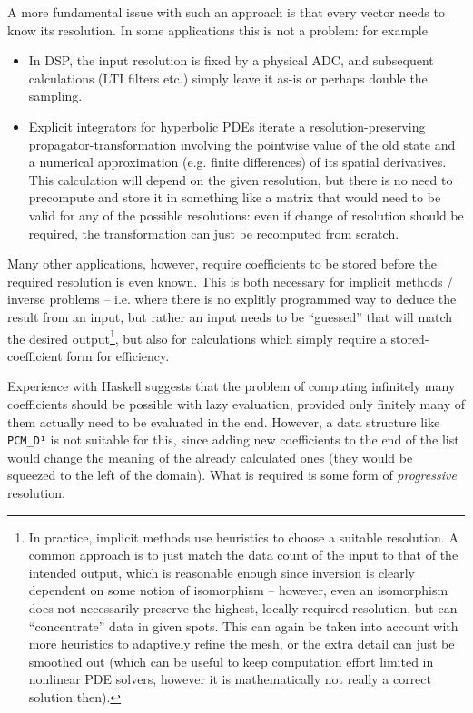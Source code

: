 \documentclass[final,sigplan,review,anonymous]{acmart}\settopmatter{printfolios=true,printccs=false,printacmref=false}
\theoremstyle{acmplain}
\theoremstyle{acmdefinition}
\begin{document}
A more fundamental issue with such an approach is that every vector needs to know its resolution.
In some applications this is not a problem: for example
\begin{itemize}
 \item In DSP, the input resolution is fixed by a physical ADC, and subsequent calculations (LTI filters etc.) simply leave it as-is or perhaps double the sampling.
 \item Explicit integrators for hyperbolic PDEs iterate a re\-so\-lu\-tion-pre\-ser\-ving pro\-pa\-ga\-tor-trans\-for\-ma\-tion in\-vol\-ving the pointwise value of the old state and a numerical approximation (e.g. finite differences) of its spatial derivatives. This calculation will depend on the given resolution, but there is no need to precompute and store it in something like a matrix that would need to be valid for any of the possible resolutions: even if change of resolution should be required, the transformation can just be recomputed from scratch.
\end{itemize}
Many other applications, however, require coefficients to be stored before the required resolution is even known.
This is both necessary for implicit methods / inverse problems -- i.e. where there is no explitly programmed way to deduce the result from an input, but rather an input needs to be “guessed” that will match the desired output\footnote{
In practice, implicit methods use heuristics to choose a suitable resolution. A common approach is to just match the data count of the input to that of the intended output, which is reasonable enough since inversion is clearly dependent on some notion of isomorphism -- however, even an isomorphism does not necessarily preserve the highest, locally required resolution, but can “concentrate” data in given spots. This can again be taken into account with more heuristics to adaptively refine the mesh, or the extra detail can just be smoothed out (which can be useful to keep computation effort limited in nonlinear PDE solvers, however it is mathematically not really a correct solution then).
}, but also for calculations which simply require a stored-coefficient form for efficiency.

Experience with Haskell suggests that the problem of computing infinitely many coefficients should be possible with lazy evaluation, provided only finitely many of them actually need to be evaluated in the end.
However, a data structure like \lstinline`PCM_D¹` is not suitable for this, since adding new coefficients to the end of the list would change the meaning of the already calculated ones (they would be squeezed to the left of the domain).
What is required is some form of \emph{progressive} resolution.
\end{document}
